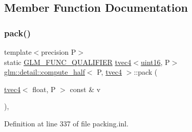 \subsection{Member Function Documentation}
\mbox{\label{structglm_1_1detail_1_1compute__half_3_01_p_00_01tvec4_01_4_a10c39dc8342760eee962fb57e5d8a391}} 
\subsubsection{\texorpdfstring{pack()}{pack()}}
{\footnotesize\ttfamily template$<$precision P$>$ \\
static \mbox{\hyperlink{setup_8hpp_a33fdea6f91c5f834105f7415e2a64407}{G\+L\+M\+\_\+\+F\+U\+N\+C\+\_\+\+Q\+U\+A\+L\+I\+F\+I\+ER}} \mbox{\hyperlink{structglm_1_1tvec4}{tvec4}}$<$\mbox{\hyperlink{namespaceglm_1_1detail_a47b2a7d006d187338e8031a352d1ce56}{uint16}}, P$>$ \mbox{\hyperlink{structglm_1_1detail_1_1compute__half}{glm\+::detail\+::compute\+\_\+half}}$<$ P, \mbox{\hyperlink{structglm_1_1tvec4}{tvec4}} $>$\+::pack (\begin{DoxyParamCaption}\item[{\mbox{\hyperlink{structglm_1_1tvec4}{tvec4}}$<$ float, P $>$ const \&}]{v }\end{DoxyParamCaption})\hspace{0.3cm}{\ttfamily [inline]}, {\ttfamily [static]}}



Definition at line 337 of file packing.\+inl.

\mbox{\label{structglm_1_1detail_1_1compute__half_3_01_p_00_01tvec4_01_4_a60cf0de8f240ff4836f7f96799cf5494}} 
